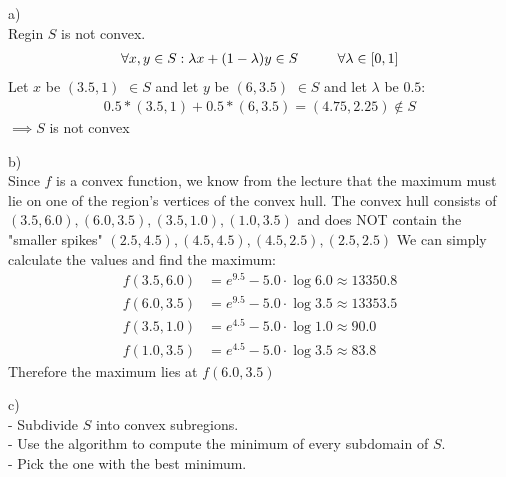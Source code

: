 %
\begin{flushleft}
a)\\
Regin $S$ is not convex.
\begin{align*}
\forall x,y \in S: \lambda x + (1-\lambda)y \in S \hspace{10mm}\forall \lambda \in [0,1]
\end{align*}
Let $x$ be $(3.5,1)$ $\in S$ and let $y$ be $(6,3.5)$ $\in S$ and let $\lambda$ be $0.5$:
\begin{align*}
0.5*(3.5,1) + 0.5*(6,3.5) = (4.75, 2.25) \notin S
\end{align*}
$\implies S$ is not convex
\end{flushleft}
\begin{flushleft}
b)\\
Since $f$ is a convex function, we know from the lecture that the maximum must lie on one of the region's vertices of the convex hull. The convex hull consists of $(3.5,6.0), (6.0,3.5), (3.5,1.0), (1.0,3.5)$ and does NOT contain the "smaller spikes" $(2.5,4.5), (4.5,4.5), (4.5,2.5), (2.5,2.5)$ We can simply calculate the values and find the maximum:
\begin{align*}
  f(3.5,6.0) &= e^{9.5} - 5.0 \cdot \log{6.0} \approx 13350.8 \\
  f(6.0,3.5) &= e^{9.5} - 5.0 \cdot \log{3.5} \approx \mathbf{13353.5} \\
  f(3.5,1.0) &= e^{4.5} - 5.0 \cdot \log{1.0} \approx 90.0 \\
  f(1.0,3.5) &= e^{4.5} - 5.0 \cdot \log{3.5} \approx 83.8
\end{align*}
Therefore the maximum lies at $f(6.0, 3.5)$
\end{flushleft}
\begin{flushleft}
c)\\
- Subdivide $S$ into convex subregions.\\
- Use the algorithm to compute the minimum of every subdomain of $S$.\\
- Pick the one with the best minimum. 
\end{flushleft}
%
%
%

%




